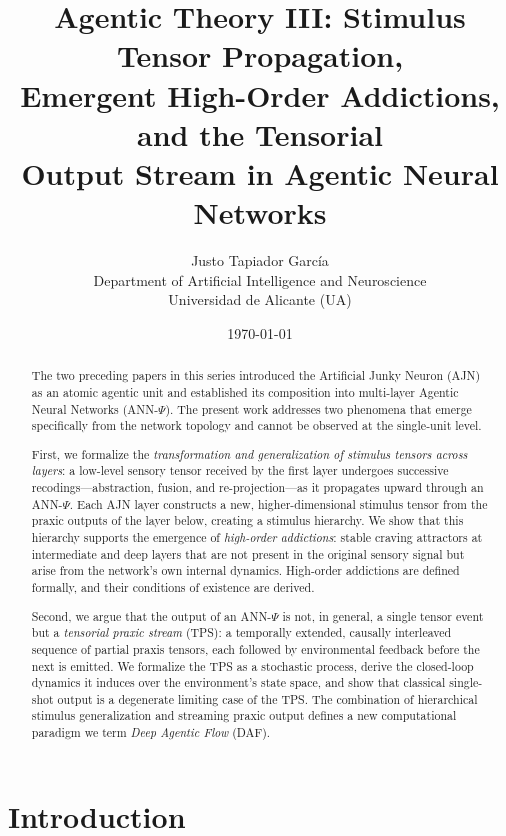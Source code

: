 \documentclass[12pt,a4paper]{article}
\title{\textbf{Agentic Theory III: Stimulus Tensor Propagation,\\
Emergent High-Order Addictions, and the Tensorial\\
Output Stream in Agentic Neural Networks}}
\author{Justo Tapiador García \\
Department of Artificial Intelligence and Neuroscience \\
Universidad de Alicante (UA)}
\date{\today}
\begin{document}

\maketitle

\begin{abstract}
The two preceding papers in this series introduced the Artificial Junky Neuron (AJN)
as an atomic agentic unit and established its composition into multi-layer Agentic
Neural Networks (ANN-$\Psi$). The present work addresses two phenomena that emerge
specifically from the network topology and cannot be observed at the single-unit level.

First, we formalize the \textit{transformation and generalization of stimulus tensors
across layers}: a low-level sensory tensor received by the first layer undergoes
successive recodings---abstraction, fusion, and re-projection---as it propagates
upward through an ANN-$\Psi$. Each AJN layer constructs a new, higher-dimensional
stimulus tensor from the praxic outputs of the layer below, creating a stimulus
hierarchy. We show that this hierarchy supports the emergence of \textit{high-order
addictions}: stable craving attractors at intermediate and deep layers that are not
present in the original sensory signal but arise from the network's own internal
dynamics. High-order addictions are defined formally, and their conditions of
existence are derived.

Second, we argue that the output of an ANN-$\Psi$ is not, in general, a single
tensor event but a \textit{tensorial praxic stream} (TPS): a temporally extended,
causally interleaved sequence of partial praxis tensors, each followed by
environmental feedback before the next is emitted. We formalize the TPS as a
stochastic process, derive the closed-loop dynamics it induces over the
environment's state space, and show that classical single-shot output is a
degenerate limiting case of the TPS. The combination of hierarchical stimulus
generalization and streaming praxic output defines a new computational paradigm
we term \textit{Deep Agentic Flow} (DAF).
\end{abstract}

\tableofcontents
\newpage

\section{Introduction}
\end{document}
